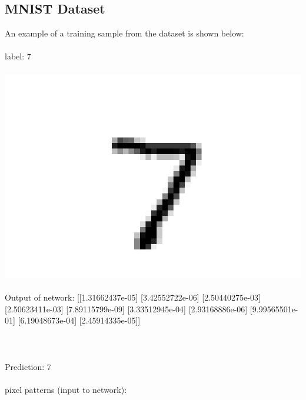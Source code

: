 \documentclass[titlepage]{article}
\begin{document}
\subsection{MNIST Dataset}
An example of a training sample from the dataset is shown below:
\\\\
label: 7
\\\\
\includegraphics[width=\linewidth]{assets/mnist_example.png}
\\\\
Output of network:
[[1.31662437e-05]
 [3.42552722e-06]
 [2.50440275e-03]
 [2.50623411e-03]
 [7.89115799e-09]
 [3.33512945e-04]
 [2.93168886e-06]
 [9.99565501e-01]
 [6.19048673e-04]
 [2.45914335e-05]]
\\\\
\\\\
Prediction: 7
\\\\
pixel patterns (input to network): 
\end{document}
